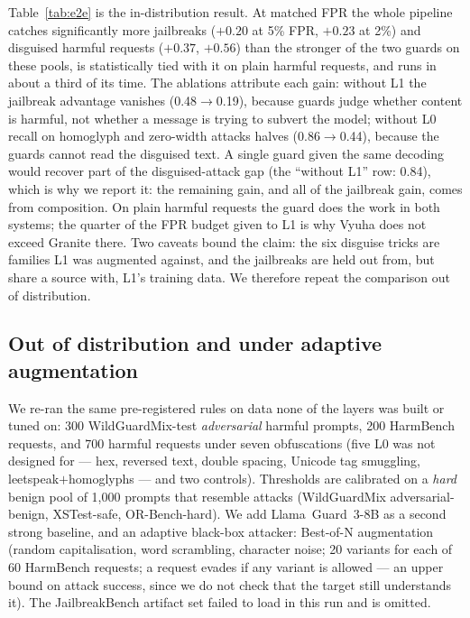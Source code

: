 \documentclass[11pt]{article}
\begin{document}
Table~\ref{tab:e2e} is the in-distribution result. At matched FPR the whole pipeline catches significantly more
jailbreaks ($+0.20$ at 5\% FPR, $+0.23$ at 2\%) and disguised harmful requests ($+0.37$, $+0.56$) than the
stronger of the two guards on these pools, is statistically tied with it on plain harmful requests, and runs in
about a third of its time. The ablations attribute each gain: without L1 the jailbreak advantage vanishes
(0.48$\rightarrow$0.19), because guards judge whether content is harmful, not whether a message is trying
to subvert the model; without L0 recall on homoglyph and zero-width attacks halves (0.86$\rightarrow$0.44),
because the guards cannot read the disguised text. A single guard given the same decoding would recover
part of the disguised-attack gap (the ``without L1'' row: 0.84), which is why we report it: the remaining
gain, and all of the jailbreak gain, comes from composition. On plain harmful requests the guard does the
work in both systems; the quarter of the FPR budget given to L1 is why Vyuha does not exceed Granite there.
Two caveats bound the claim: the six disguise tricks are families L1 was augmented against, and the
jailbreaks are held out from, but share a source with, L1's training data. We therefore repeat the
comparison out of distribution.

\subsection{Out of distribution and under adaptive augmentation}
We re-ran the same pre-registered rules on data none of the layers was built or tuned on: 300
WildGuardMix-test \emph{adversarial} harmful prompts, 200 HarmBench requests, and 700 harmful requests
under seven obfuscations (five L0 was not designed for --- hex, reversed text, double spacing, Unicode tag
smuggling, leetspeak$+$homoglyphs --- and two controls). Thresholds are calibrated on a \emph{hard}
benign pool of 1{,}000 prompts that resemble attacks (WildGuardMix adversarial-benign, XSTest-safe,
OR-Bench-hard). We add Llama~Guard~3-8B as a second strong baseline, and an adaptive black-box attacker:
Best-of-N augmentation \citep{bon} (random capitalisation, word scrambling, character noise; 20 variants
for each of 60 HarmBench requests; a request evades if any variant is allowed --- an upper bound on attack
success, since we do not check that the target still understands it). The JailbreakBench artifact set
failed to load in this run and is omitted.
\end{document}
